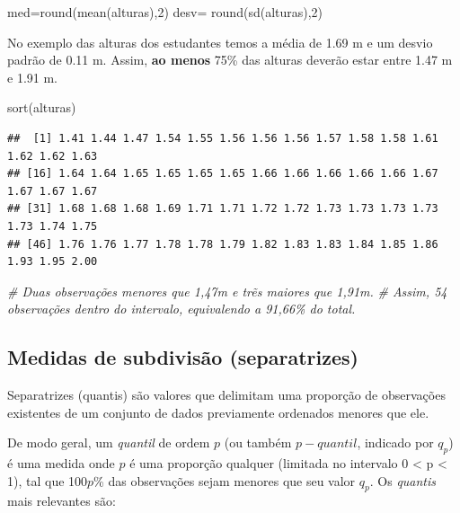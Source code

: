 \documentclass[
]{book}
\newenvironment{Shaded}{\begin{snugshade}}{\end{snugshade}}
\newcommand{\CommentTok}[1]{\textcolor[rgb]{0.56,0.35,0.01}{\textit{#1}}}
\newcommand{\DecValTok}[1]{\textcolor[rgb]{0.00,0.00,0.81}{#1}}
\newcommand{\FunctionTok}[1]{\textcolor[rgb]{0.00,0.00,0.00}{#1}}
\newcommand{\NormalTok}[1]{#1}
\newcommand{\OtherTok}[1]{\textcolor[rgb]{0.56,0.35,0.01}{#1}}
\begin{document}
\begin{Shaded}
\begin{Highlighting}[]
\NormalTok{med}\OtherTok{=}\FunctionTok{round}\NormalTok{(}\FunctionTok{mean}\NormalTok{(alturas),}\DecValTok{2}\NormalTok{)}
\NormalTok{desv}\OtherTok{=} \FunctionTok{round}\NormalTok{(}\FunctionTok{sd}\NormalTok{(alturas),}\DecValTok{2}\NormalTok{)}
\end{Highlighting}
\end{Shaded}

No exemplo das alturas dos estudantes temos a média de 1.69 m e um desvio padrão de 0.11 m. Assim, \textbf{ao menos} 75\% das alturas deverão estar entre 1.47 m e 1.91 m.

\begin{Shaded}
\begin{Highlighting}[]
\FunctionTok{sort}\NormalTok{(alturas)}
\end{Highlighting}
\end{Shaded}

\begin{verbatim}
##  [1] 1.41 1.44 1.47 1.54 1.55 1.56 1.56 1.56 1.57 1.58 1.58 1.61 1.62 1.62 1.63
## [16] 1.64 1.64 1.65 1.65 1.65 1.65 1.66 1.66 1.66 1.66 1.66 1.67 1.67 1.67 1.67
## [31] 1.68 1.68 1.68 1.69 1.71 1.71 1.72 1.72 1.73 1.73 1.73 1.73 1.73 1.74 1.75
## [46] 1.76 1.76 1.77 1.78 1.78 1.79 1.82 1.83 1.83 1.84 1.85 1.86 1.93 1.95 2.00
\end{verbatim}

\begin{Shaded}
\begin{Highlighting}[]
\CommentTok{\# Duas observações menores que 1,47m e trẽs maiores que 1,91m.}
\CommentTok{\# Assim, 54 observações dentro do intervalo, equivalendo a 91,66\% do total.}
\end{Highlighting}
\end{Shaded}

\hypertarget{medidas-de-subdivisuxe3o-separatrizes}{%
\subsection{Medidas de subdivisão (separatrizes)}\label{medidas-de-subdivisuxe3o-separatrizes}}

Separatrizes (quantis) são valores que delimitam uma proporção de observações existentes de um conjunto de dados previamente ordenados menores que ele.

De modo geral, um \emph{quantil} de ordem \(p\) (ou também \(p-quantil\), indicado por \(q_{p}\)) é uma medida onde \(p\) é uma proporção qualquer (limitada no intervalo 0 \textless{} p \textless{} 1), tal que 100\(p\)\% das observações sejam menores que seu valor \(q_{p}\). Os \emph{quantis} mais relevantes são:
\end{document}
